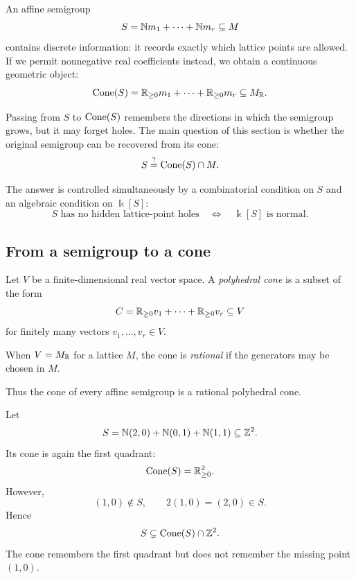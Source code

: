 An affine semigroup
\[
S=\mathbb{N} m_1+\cdots+\mathbb{N} m_r\subseteq M
\]
contains discrete information: it records exactly which lattice points
are allowed. If we permit nonnegative real coefficients instead, we
obtain a continuous geometric object:
\[
\operatorname{Cone}(S)
=
\mathbb{R}_{\geq0}m_1+\cdots+\mathbb{R}_{\geq0}m_r
\subseteq M_{\mathbb{R}}.
\]

Passing from \(S\) to \(\operatorname{Cone}(S)\) remembers the directions in which
the semigroup grows, but it may forget holes. The main question of
this section is whether the original semigroup can be recovered from
its cone:
\[
S\stackrel{?}{=}\operatorname{Cone}(S)\cap M.
\]

The answer is controlled simultaneously by a combinatorial condition
on \(S\) and an algebraic condition on \(\Bbbk[S]\):
\[
\boxed{
S\text{ has no hidden lattice-point holes}
\quad\Longleftrightarrow\quad
\Bbbk[S]\text{ is normal}.
}
\]

\subsection{From a semigroup to a cone}

\begin{definition}
Let \(V\) be a finite-dimensional real vector space. A
\emph{polyhedral cone} is a subset of the form
\[
C
=
\mathbb{R}_{\geq0}v_1+\cdots+\mathbb{R}_{\geq0}v_r
\subseteq V
\]
for finitely many vectors \(v_1,\ldots,v_r\in V\).

When \(V=M_{\mathbb{R}}\) for a lattice \(M\), the cone is
\emph{rational} if the generators may be chosen in \(M\).
\end{definition}

Thus the cone of every affine semigroup is a rational polyhedral
cone.

\begin{example}
Let
\[
S
=
\mathbb{N}(2,0)+\mathbb{N}(0,1)+\mathbb{N}(1,1)
\subseteq\mathbb{Z}^2.
\]
Its cone is again the first quadrant:
\[
\operatorname{Cone}(S)
=
\mathbb{R}_{\geq0}^2.
\]
However,
\[
(1,0)\notin S,
\qquad
2(1,0)=(2,0)\in S.
\]
Hence
\[
S\subsetneq\operatorname{Cone}(S)\cap\mathbb{Z}^2.
\]
The cone remembers the first quadrant but does not remember the
missing point \((1,0)\).
\end{example}

